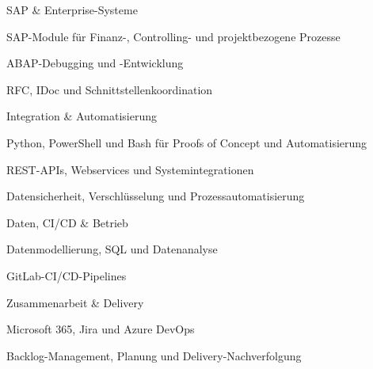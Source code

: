 

\begin{cventries}
  \zcventry
    {SAP \& Enterprise-Systeme} %
    {
      \begin{cvitems} %
        \item {SAP-Module für Finanz-, Controlling- und projektbezogene Prozesse}
        \item {ABAP-Debugging und -Entwicklung}
        \item {RFC, IDoc und Schnittstellenkoordination}
      \end{cvitems}
    }

  \zcventry
    {Integration \& Automatisierung} %
    {
      \begin{cvitems} %
        \item {Python, PowerShell und Bash für Proofs of Concept und Automatisierung}
        \item {REST-APIs, Webservices und Systemintegrationen}
        \item {Datensicherheit, Verschlüsselung und Prozessautomatisierung}
      \end{cvitems}
    }

  \zcventry
    {Daten, CI/CD \& Betrieb} %
    {
      \begin{cvitems} %
        \item {Datenmodellierung, SQL und Datenanalyse}
        \item {GitLab-CI/CD-Pipelines}
      \end{cvitems}
    }

  \zcventry
    {Zusammenarbeit \& Delivery} %
    {
      \begin{cvitems} %
        \item {Microsoft 365, Jira und Azure DevOps}
        \item {Backlog-Management, Planung und Delivery-Nachverfolgung}
      \end{cvitems}
    }


\end{cventries}
